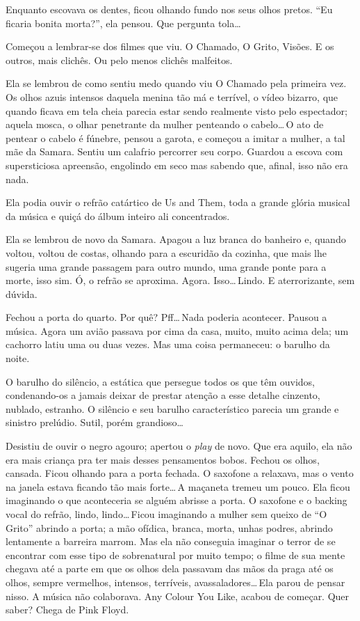 Enquanto escovava os dentes, ficou olhando fundo nos seus olhos pretos. ``Eu ficaria bonita morta?'', ela pensou. Que pergunta tola\ldots

Começou a lembrar-se dos filmes que viu. O Chamado, O Grito, Visões. E os outros, mais clichês. Ou pelo menos clichês malfeitos.

Ela se lembrou de como sentiu medo quando viu O Chamado pela primeira vez. Os olhos azuis intensos daquela menina tão má e terrível, o vídeo bizarro, que quando ficava em tela cheia parecia estar sendo realmente visto pelo espectador; aquela mosca, o olhar penetrante da mulher penteando o cabelo\ldots\,O ato de pentear o cabelo é fúnebre, pensou a garota, e começou a imitar a mulher, a tal mãe da Samara. Sentiu um calafrio percorrer seu corpo. Guardou a escova com supersticiosa apreensão, engolindo em seco mas sabendo que, afinal, isso não era nada.

Ela podia ouvir o refrão catártico de Us and Them, toda a grande glória musical da música e quiçá do álbum inteiro ali concentrados.

Ela se lembrou de novo da Samara. Apagou a luz branca do banheiro e, quando voltou, voltou de costas, olhando para a escuridão da cozinha, que mais lhe sugeria uma grande passagem para outro mundo, uma grande ponte para a morte, isso sim. Ó, o refrão se aproxima. Agora. Isso\ldots\,Lindo. E aterrorizante, sem dúvida.

Fechou a porta do quarto. Por quê? Pff\ldots\,Nada poderia acontecer. Pausou a música. Agora um avião passava por cima da casa, muito, muito acima dela; um cachorro latiu uma ou duas vezes. Mas uma coisa permaneceu: o barulho da noite.

O barulho do silêncio, a estática que persegue todos os que têm ouvidos, condenando-os a jamais deixar de prestar atenção a esse detalhe cinzento, nublado, estranho. O silêncio e seu barulho característico parecia um grande e sinistro prelúdio. Sutil, porém grandioso\ldots

Desistiu de ouvir o negro agouro; apertou o \emph{play} de novo. Que era aquilo, ela não era mais criança pra ter mais desses pensamentos bobos. Fechou os olhos, cansada. Ficou olhando para a porta fechada. O saxofone a relaxava, mas o vento na janela estava ficando tão mais forte\ldots\,A maçaneta tremeu um pouco. Ela ficou imaginando o que aconteceria se alguém abrisse a porta. O saxofone e o backing vocal do refrão, lindo, lindo\ldots\,Ficou imaginando a mulher sem queixo de ``O Grito'' abrindo a porta; a mão ofídica, branca, morta, unhas podres, abrindo lentamente a barreira marrom. Mas ela não conseguia imaginar o terror de se encontrar com esse tipo de sobrenatural por muito tempo; o filme de sua mente chegava até a parte em que os olhos dela passavam das mãos da praga até os olhos, sempre vermelhos, intensos, terríveis, avassaladores\ldots\,Ela parou de pensar nisso. A música não colaborava. Any Colour You Like, acabou de começar. Quer saber? Chega de Pink Floyd.

